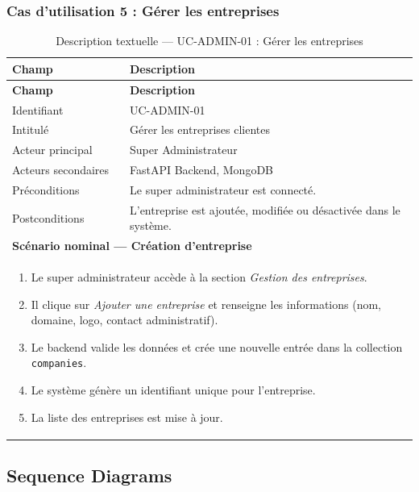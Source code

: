 \subsubsection{Cas d'utilisation 5 : Gérer les entreprises}

\renewcommand{\arraystretch}{1.4}
\begin{longtable}{|p{4cm}|p{10cm}|}
\caption{Description textuelle — UC-ADMIN-01 : Gérer les entreprises}
\label{tab:uc_admin01} \\
\hline
\rowcolor[HTML]{EFEFEF} \textbf{Champ} & \textbf{Description} \\ \hline
\endfirsthead
\hline
\rowcolor[HTML]{EFEFEF} \textbf{Champ} & \textbf{Description} \\ \hline
\endhead
\hline
\endfoot
\hline
\endlastfoot
Identifiant & UC-ADMIN-01 \\ \hline
Intitulé & Gérer les entreprises clientes \\ \hline
Acteur principal & Super Administrateur \\ \hline
Acteurs secondaires & FastAPI Backend, MongoDB \\ \hline
Préconditions & Le super administrateur est connecté. \\ \hline
Postconditions & L'entreprise est ajoutée, modifiée ou désactivée dans le système. \\ \hline
\multicolumn{2}{|l|}{\textbf{Scénario nominal — Création d'entreprise}} \\ \hline
\multicolumn{2}{|p{14.5cm}|}{
\vspace{2pt}
\begin{enumerate}
    \item Le super administrateur accède à la section \textit{Gestion des entreprises}.
    \item Il clique sur \textit{Ajouter une entreprise} et renseigne les informations (nom, domaine, logo, contact administratif).
    \item Le backend valide les données et crée une nouvelle entrée dans la collection \texttt{companies}.
    \item Le système génère un identifiant unique pour l'entreprise.
    \item La liste des entreprises est mise à jour.
\end{enumerate}
\vspace{2pt}
} \\ \hline
\end{longtable}
\renewcommand{\arraystretch}{1}

\subsection{Sequence Diagrams}

